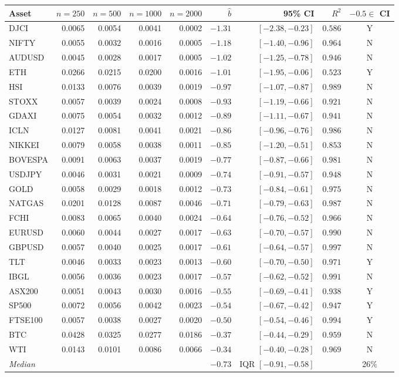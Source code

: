 \begin{tabular}{lrrrrrrrc}
\toprule
Asset & $n{=}250$ & $n{=}500$ & $n{=}1000$ & $n{=}2000$ & $\hat{b}$ & 95\% CI & $R^2$ & $-0.5 \in$ CI \\
\midrule
  DJCI & 0.0065 & 0.0054 & 0.0041 & 0.0002 & $-1.31$ & $[-2.38, -0.23]$ & $0.586$ & Y \\
  NIFTY & 0.0055 & 0.0032 & 0.0016 & 0.0005 & $-1.18$ & $[-1.40, -0.96]$ & $0.964$ & N \\
  AUDUSD & 0.0045 & 0.0028 & 0.0017 & 0.0005 & $-1.02$ & $[-1.25, -0.78]$ & $0.946$ & N \\
  ETH & 0.0266 & 0.0215 & 0.0200 & 0.0016 & $-1.01$ & $[-1.95, -0.06]$ & $0.523$ & Y \\
  HSI & 0.0133 & 0.0076 & 0.0039 & 0.0019 & $-0.97$ & $[-1.07, -0.87]$ & $0.989$ & N \\
  STOXX & 0.0057 & 0.0039 & 0.0024 & 0.0008 & $-0.93$ & $[-1.19, -0.66]$ & $0.921$ & N \\
  GDAXI & 0.0075 & 0.0054 & 0.0032 & 0.0012 & $-0.89$ & $[-1.11, -0.67]$ & $0.941$ & N \\
  ICLN & 0.0127 & 0.0081 & 0.0041 & 0.0021 & $-0.86$ & $[-0.96, -0.76]$ & $0.986$ & N \\
  NIKKEI & 0.0079 & 0.0058 & 0.0038 & 0.0011 & $-0.85$ & $[-1.20, -0.51]$ & $0.853$ & N \\
  BOVESPA & 0.0091 & 0.0063 & 0.0037 & 0.0019 & $-0.77$ & $[-0.87, -0.66]$ & $0.981$ & N \\
  USDJPY & 0.0046 & 0.0031 & 0.0021 & 0.0009 & $-0.74$ & $[-0.91, -0.57]$ & $0.948$ & N \\
  GOLD & 0.0058 & 0.0029 & 0.0018 & 0.0012 & $-0.73$ & $[-0.84, -0.61]$ & $0.975$ & N \\
  NATGAS & 0.0201 & 0.0128 & 0.0087 & 0.0046 & $-0.71$ & $[-0.79, -0.63]$ & $0.987$ & N \\
  FCHI & 0.0083 & 0.0065 & 0.0040 & 0.0024 & $-0.64$ & $[-0.76, -0.52]$ & $0.966$ & N \\
  EURUSD & 0.0060 & 0.0044 & 0.0027 & 0.0017 & $-0.63$ & $[-0.70, -0.57]$ & $0.990$ & N \\
  GBPUSD & 0.0057 & 0.0040 & 0.0025 & 0.0017 & $-0.61$ & $[-0.64, -0.57]$ & $0.997$ & N \\
  TLT & 0.0046 & 0.0033 & 0.0023 & 0.0013 & $-0.60$ & $[-0.70, -0.50]$ & $0.971$ & Y \\
  IBGL & 0.0056 & 0.0036 & 0.0023 & 0.0017 & $-0.57$ & $[-0.62, -0.52]$ & $0.991$ & N \\
  ASX200 & 0.0051 & 0.0043 & 0.0030 & 0.0016 & $-0.55$ & $[-0.69, -0.41]$ & $0.938$ & Y \\
  SP500 & 0.0072 & 0.0056 & 0.0042 & 0.0023 & $-0.54$ & $[-0.67, -0.42]$ & $0.947$ & Y \\
  FTSE100 & 0.0057 & 0.0038 & 0.0027 & 0.0020 & $-0.50$ & $[-0.54, -0.46]$ & $0.994$ & Y \\
  BTC & 0.0428 & 0.0325 & 0.0277 & 0.0186 & $-0.37$ & $[-0.44, -0.29]$ & $0.959$ & N \\
  WTI & 0.0143 & 0.0101 & 0.0086 & 0.0066 & $-0.34$ & $[-0.40, -0.28]$ & $0.969$ & N \\
\midrule
  \textit{Median} & & & & & $-0.73$ & IQR $[-0.91,-0.58]$ & & 26\% \\
\bottomrule
\end{tabular}